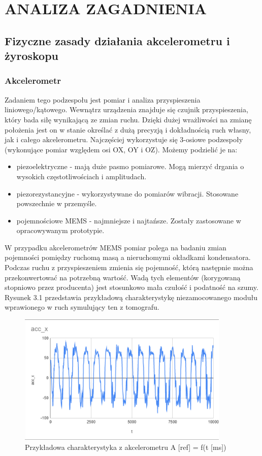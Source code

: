 \chapter{ANALIZA ZAGADNIENIA}

\section{Fizyczne zasady działania akcelerometru i żyroskopu}

\subsection{Akcelerometr}

Zadaniem tego podzespołu jest pomiar i analiza przyspieszenia liniowego/kątowego. Wewnątrz urządzenia znajduje się czujnik przyspieszenia, który bada siłę wynikającą ze zmian ruchu. Dzięki dużej wrażliwości na zmianę położenia jest on w stanie określać z dużą precyzją i dokładnością ruch własny, jak i całego akcelerometru. Najczęściej wykorzystuje się 3-osiowe podzespoły (wykonujące pomiar względem osi OX, OY i OZ). Możemy podzielić je na:

\begin{itemize}
    \item piezoelektryczne - mają duże pasmo pomiarowe. Mogą mierzyć drgania o wysokich częstotliwościach i amplitudach. 
    \item piezorezystancyjne - wykorzystywane do pomiarów wibracji. Stosowane powszechnie w przemyśle.
    \item pojemnościowe MEMS - najmniejsze i najtańsze. Zostały zastosowane w opracowywanym prototypie.
\end{itemize}

W przypadku akcelerometrów MEMS pomiar polega na badaniu zmian pojemności pomiędzy ruchomą masą a nieruchomymi okładkami kondensatora. Podczas ruchu z przyspieszeniem zmienia się pojemność, którą następnie można przekonwertować na potrzebną wartość. Wadą tych elementów (korygowaną stopniowo przez producenta) jest stosunkowo mała czułość i podatność na szumy. Rysunek 3.1 przedstawia przykładową charakterystykę niezamocowanego modułu wprawionego w ruch symulujący ten z tomografu.

\begin{figure}[H]
    \centering
    \includegraphics[width=0.9\textwidth]{pictures/raw.png}
    \caption{Przykładowa charakterystyka z akcelerometru A [ref] = f(t [ms])}
    \label{fig:raw}
\end{figure}


